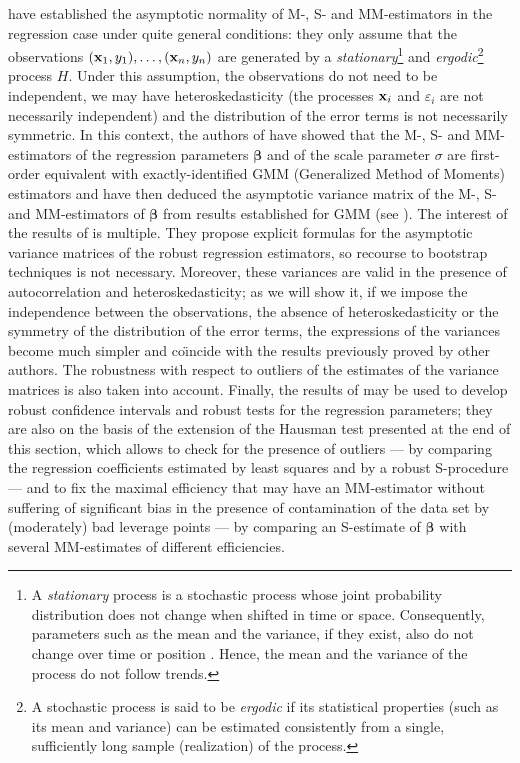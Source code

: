 \citet{Croux:2003} have established the asymptotic normality of M-,
S- and MM-estimators in the regression case under quite general conditions:
they only assume that the observations $\left(  \stvec{x}_{1},y_{1}\right)
,\ldots,\left(  \stvec{x}_{n},y_{n}\right)  $ are generated by a
\emph{stationary}\footnote{A \emph{stationary} process is a stochastic
process whose joint probability distribution does not change when shifted in
time or space. Consequently, parameters such as the mean and the variance, if
they exist, also do not change over time or position . Hence, the mean and the
variance of the process do not follow trends.} and \emph{ergodic}\footnote{A
stochastic process is said to be \emph{ergodic} if its statistical
properties (such as its mean and variance) can be estimated consistently from
a single, sufficiently long sample (realization) of the process.} process $H$.
Under this assumption, the observations do not need to be independent, we may
have heteroskedasticity (the processes $\mathbf x_{i}$ and $\varepsilon_{i}$
are not necessarily independent) and the distribution of the error terms is
not necessarily symmetric. In this context, the authors of
\citet{Croux:2003} have showed that the M-, S- and
MM-estimators of the regression parameters $\boldsymbol\beta$ and of the
scale parameter $\sigma$ are first-order equivalent with exactly-identified
GMM (Generalized Method of Moments) estimators and have then deduced the
asymptotic variance matrix of the M-, S- and MM-estimators of
$\boldsymbol\beta$ from results established for GMM (see \citealp{Hansen:1982}). 
The interest of the results of \citet{Croux:2003} is
multiple. They propose explicit formulas for the asymptotic variance matrices
of the robust regression estimators, so recourse to bootstrap techniques is
not necessary. Moreover, these variances are valid in the presence of
autocorrelation and heteroskedasticity; as we will show it, if we impose the
independence between the observations, the absence of heteroskedasticity or
the symmetry of the distribution of the error terms, the expressions of the
variances become much simpler and co\"{\i}ncide with the results previously
proved by other authors. The robustness with respect to outliers of the
estimates of the variance matrices is also taken into account. Finally, the
results of \citet{Croux:2003} may be used to develop robust
confidence intervals and robust tests for the regression parameters; they are
also on the basis of the extension of the Hausman test presented at the end of
this section, which allows to check for the presence of outliers --- by
comparing the regression coefficients estimated by least squares and by a
robust S-procedure --- and to fix the maximal efficiency that may have an
MM-estimator without suffering of significant bias in the presence of
contamination of the data set by (moderately) bad leverage points --- by
comparing an S-estimate of $\boldsymbol\beta$ with several MM-estimates of
different efficiencies.

